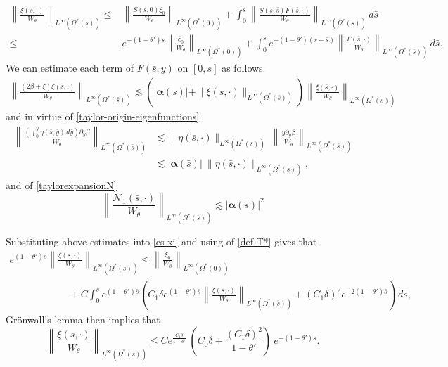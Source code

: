 \documentclass[12pt]{amsart}
\numberwithin{equation}{section}
\numberwithin{equation}{section}
\begin{document}
   \begin{align}\label{es-xi}
 \left\|\frac{\xi(s, \cdot)}{W_\theta} \right\|_{L^\infty(\Omega^*(s))}\leq&  \left\|\frac{S(s, 0)\xi_0}{W_\theta}\right\|_{L^\infty(\Omega^*(0))}+ \int_0^s  \left\|\frac{S(s,  \bar s) F(\bar s,  \cdot)}{W_\theta} \right\|_{L^\infty(\Omega^*(s))}\,d\bar s\nonumber\\
   \leq&  e^{-(1-\theta')s}\left\|\frac{ \xi_0}{W_\theta}\right\|_{L^\infty(\Omega^*(0))} +\int_0^s e^{-(1-\theta')(s-\bar s)} \left\|\frac{ F(\bar s, \cdot)}{W_\theta}\right\|_{L^\infty(\Omega^*(\bar s))}\,d\bar s.
    \end{align}
We can estimate each term of  $F(\bar s, y)$ on $[0, s]$ as follows.
\begin{align*}
\left\|\frac{\left( 2\beta+\xi \right)\xi(\bar s, \cdot)}{W_\theta}\right\|_{L^\infty(\Omega^*(\bar s))}\lesssim \left(|\boldsymbol\alpha(s)| +\|\xi(s, \cdot)\|_{L^\infty(\Omega^*(\bar s))}\right)\left\|\frac{\xi(\bar s, \cdot)}{W_\theta}\right\|_{L^\infty(\Omega^*(\bar s))}
\end{align*}
    and in virtue of  \eqref{taylor-origin-eigenfunctions}
    \begin{align*}
  \left\|\frac{\left(\int_{0}^y \eta(\bar s, \bar y) \,d\bar y\right) \partial_y \beta}{W_\theta}\right\|_{L^\infty(\Omega^*(\bar s))}   &\lesssim  \|\eta(\bar s,  \cdot) \|_{L^\infty(\Omega^*(\bar s))} ~ \left\|\frac{y\partial_y \beta}{W_\theta}\right\|_{L^\infty(\Omega^*(\bar s))}\\
  &\lesssim |\boldsymbol\alpha(\bar s)|~ \|\eta(\bar s,  \cdot) \|_{L^\infty(\Omega^*(\bar s))},
    \end{align*}
    and of \eqref{taylorexpansionN}
    \begin{equation*}
      \left\|\frac{\mathcal{N}_1(\bar s,  \cdot)}{W_\theta}\right\|_{L^\infty(\Omega^*(\bar s))}\lesssim |\boldsymbol\alpha(\bar s)|^2
    \end{equation*}
    
 Substituting above estimates into \eqref{es-xi} and using of  \eqref{def-T*} gives that
   \begin{multline*} 
   e^{(1-\theta')s} \left\| \frac{\xi(s, \cdot)}{W_\theta}\right \|_{L^\infty(\Omega^*(s))}\leq 
 \left\|\frac{ \xi_0}{W_\theta}\right\|_{L^\infty(\Omega^*(0))}\\
 \qquad  \qquad \qquad+C\int_0^se^{(1-\theta') \bar s} \left( C_1\delta   e^{(1-\theta')\bar s} \left\| \frac{\xi(\bar s,  \cdot)}{W_\theta}\right\|_{L^\infty(\Omega^*(\bar s))}+   (C_1\delta)^2  e^{-2(1-\theta')\bar s} \right)\,d\bar s,
    \end{multline*}
     Gr\"onwall's lemma  then implies that 
     \begin{equation}\label{es-xi2}
 \left \| \frac{\xi(s, \cdot)}{W_\theta} \right\|_{L^\infty(\Omega^*(s))}\leq C e^{\frac{C_1\delta}{1-\theta'}}~\left(C_0 \delta+\frac{(C_1\delta)^2}{1-\theta'} \right)~
   e^{-(1-\theta')s}.
    \end{equation}
    
\end{document}
